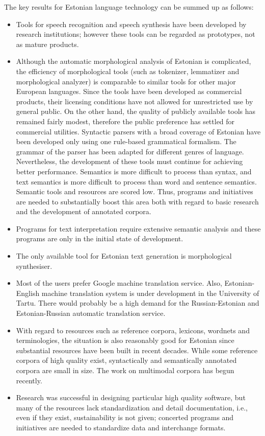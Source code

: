 \documentclass[]{../metanetpaper}
\begin{document}
\begin{multicols}{2}
The key results for Estonian language technology can be summed up as follows:

\begin{itemize}
\item Tools for speech recognition and speech synthesis have been developed by research institutions; however these tools can be regarded as prototypes, not as mature products.
\item Although the automatic morphological analysis of Estonian is complicated, the efficiency of morphological tools (such as tokenizer, lemmatizer and morphological analyzer) is comparable to similar tools for other major European languages. Since the tools have been developed as commercial products, their licensing conditions have not allowed for unrestricted use by general public. On the other hand, the quality of publicly available tools has remained fairly modest, therefore the public preference has settled for commercial utilities.
Syntactic parsers with a broad coverage of Estonian have been developed only using one rule-based grammatical formalism. The grammar of the parser has been adapted for different genres of language. Nevertheless, the development of these tools must continue for achieving better performance.
Semantics is more difficult to process than syntax, and text semantics is more difficult to process than word and sentence semantics. 
Semantic tools and resources are scored low. 
Thus, programs and initiatives are needed to substantially boost this area both with regard to basic research and the development of annotated corpora.
\item Programs for text interpretation require extensive semantic analysis and these programs are only in the initial state of development. 
\item The only available tool for Estonian text generation is morphological synthesiser.
\item Most of the users prefer Google machine translation service. Also, Estonian-English machine translation system is under development in the University of Tartu. There would probably be a high demand for the Russian-Estonian and Estonian-Russian automatic translation service.
\item With regard to resources such as reference corpora, lexicons, wordnets and terminologies, the situation is also reasonably good for Estonian since substantial resources have been built in recent decades. While some reference corpora of high quality exist, syntactically and semantically annotated corpora are small in size. The work on multimodal corpora has begun recently.
\item Research was successful in designing particular high quality software, but many of the resources lack standardization and detail documentation, i.e., even if they exist, sustainability is not given; concerted programs and initiatives are needed to standardize data and interchange formats.


\end{itemize}
\end{multicols}
\end{document}
